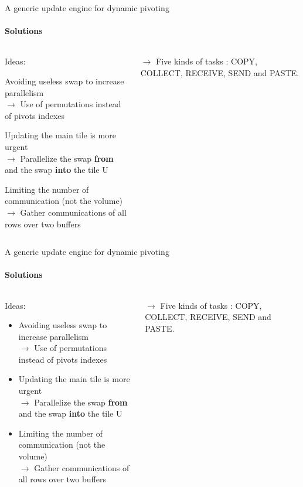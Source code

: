 \begin{frame}{A generic update engine for dynamic pivoting}
\framesubtitle{Solutions}
\begin{columns}
\begin{column}{.60\textwidth}
Ideas:
\begin{itemize}
{
\item Avoiding useless swap to increase parallelism\\
$\rightarrow$ Use of permutations instead of pivots indexes
\item Updating the main tile is more urgent\\
$\rightarrow$ Parallelize the swap \textbf{from} and the swap \textbf{into} the tile U}
\item Limiting the number of communication (not the volume)\\
$\rightarrow$ Gather communications of all rows over two buffers
\end{itemize}
\end{column}
\begin{column}{.40\textwidth}
\begin{exampleblock}{}
$\rightarrow$ Five kinds of tasks : COPY, COLLECT, RECEIVE, SEND and PASTE.
\end{exampleblock}{}
\end{column}
\end{columns}
\end{frame}

\begin{frame}{A generic update engine for dynamic pivoting}
\framesubtitle{Solutions}
\begin{columns}
\begin{column}{.60\textwidth}
Ideas:
\begin{itemize}
\item Avoiding useless swap to increase parallelism\\
$\rightarrow$ Use of permutations instead of pivots indexes
\item Updating the main tile is more urgent\\
$\rightarrow$ Parallelize the swap \textbf{from} and the swap \textbf{into} the tile U
\item Limiting the number of communication (not the volume)\\
$\rightarrow$ Gather communications of all rows over two buffers
\end{itemize}
\end{column}
\begin{column}{.40\textwidth}
\begin{exampleblock}{}
$\rightarrow$ Five kinds of tasks : COPY, COLLECT, RECEIVE, SEND and PASTE.
\end{exampleblock}{}
\end{column}
\end{columns}
\end{frame}

